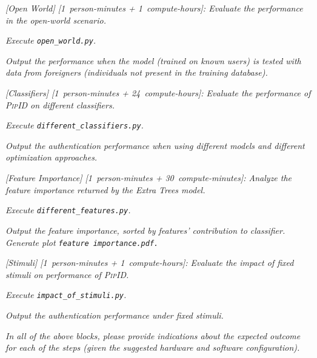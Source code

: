 \documentclass[sigconf]{acmart}
\newcommand{\sysname}{\textsc{PipID}\xspace}
\begin{document}
\begin{compactitem}
\item[(E9):] \emph{[Open World] [1~person-minutes + 1~compute-hours]: Evaluate the performance in the open-world scenario.}
  \begin{asparadesc}
  \item[Execution:] \emph{Execute \texttt{open\_world.py}.}

  \item[Results:] \emph{Output the performance when the model (trained on known users) is tested with data from foreigners (individuals not present in the training database).}
  \end{asparadesc}

\item[(E10):] \emph{[Classifiers] [1~person-minutes + 24~compute-hours]: Evaluate the performance of \sysname on different classifiers.}
  \begin{asparadesc}
  \item[Execution:] \emph{Execute \texttt{different\_classifiers.py}.}

  \item[Results:] \emph{Output the authentication performance when using different models and different optimization approaches.}
  \end{asparadesc}

\item[(E11):] \emph{[Feature Importance] [1~person-minutes + 30~compute-minutes]: Analyze the feature importance returned by the Extra Trees model.}
  \begin{asparadesc}
  \item[Execution:] \emph{Execute \texttt{different\_features.py}.}

  \item[Results:] \emph{Output the feature importance, sorted by features' contribution to classifier. Generate plot \texttt{feature importance.pdf.}}
  \end{asparadesc}

\item[(E12):] \emph{[Stimuli] [1~person-minutes + 1~compute-hours]: Evaluate the impact of fixed stimuli on performance of \sysname.}
  \begin{asparadesc}
  \item[Execution:] \emph{Execute \texttt{impact\_of\_stimuli.py}.}

  \item[Results:] \emph{Output the authentication performance under fixed stimuli.}
  \end{asparadesc}
\end{compactitem}
\bigskip

\emph{In all of the above blocks, please provide indications about the
expected outcome for each of the steps (given the suggested hardware
and software configuration).}

\end{document}
